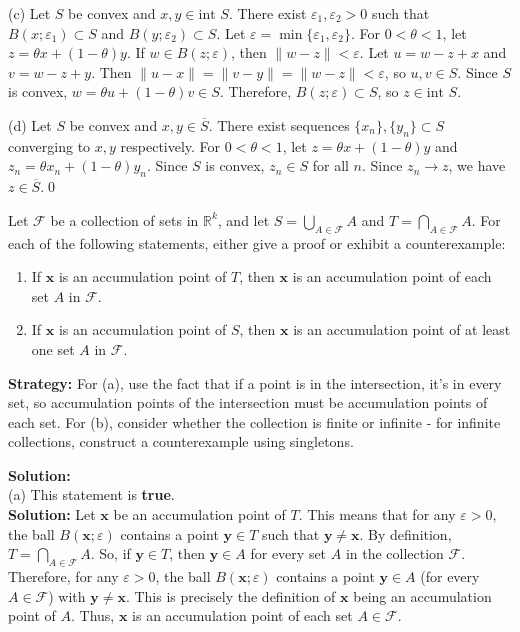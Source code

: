 (c) Let $S$ be convex and $x, y \in \text{int } S$. There exist $\varepsilon_1, \varepsilon_2 > 0$ such that $B(x;\varepsilon_1) \subset S$ and $B(y;\varepsilon_2) \subset S$. Let $\varepsilon = \min\{\varepsilon_1, \varepsilon_2\}$. For $0 < \theta < 1$, let $z = \theta x + (1-\theta)y$. If $w \in B(z;\varepsilon)$, then $\|w-z\| < \varepsilon$. Let $u = w - z + x$ and $v = w - z + y$. Then $\|u-x\| = \|v-y\| = \|w-z\| < \varepsilon$, so $u, v \in S$. Since $S$ is convex, $w = \theta u + (1-\theta)v \in S$. Therefore, $B(z;\varepsilon) \subset S$, so $z \in \text{int } S$.

(d) Let $S$ be convex and $x, y \in \overline{S}$. There exist sequences $\{x_n\}, \{y_n\} \subset S$ converging to $x, y$ respectively. For $0 < \theta < 1$, let $z = \theta x + (1-\theta)y$ and $z_n = \theta x_n + (1-\theta)y_n$. Since $S$ is convex, $z_n \in S$ for all $n$. Since $z_n \to z$, we have $z \in \overline{S}$.\qed


\begin{problembox}            
Let $\mathcal{F}$ be a collection of sets in $\mathbb{R}^k$, and let $S = \bigcup_{A \in \mathcal{F}} A$ and $T = \bigcap_{A \in \mathcal{F}} A$. For each of the following statements, either give a proof or exhibit a counterexample:
\begin{enumerate}[label=\alph*)]
\item If $\mathbf{x}$ is an accumulation point of $T$, then $\mathbf{x}$ is an accumulation point of each set $A$ in $\mathcal{F}$.
\item If $\mathbf{x}$ is an accumulation point of $S$, then $\mathbf{x}$ is an accumulation point of at least one set $A$ in $\mathcal{F}$.
\end{enumerate}
\end{problembox}

\noindent\textbf{Strategy:} For (a), use the fact that if a point is in the intersection, it's in every set, so accumulation points of the intersection must be accumulation points of each set. For (b), consider whether the collection is finite or infinite - for infinite collections, construct a counterexample using singletons.

\bigskip\noindent\textbf{Solution:}\\
(a) This statement is \textbf{true}.\\
\bigskip\noindent\textbf{Solution:} Let $\mathbf{x}$ be an accumulation point of $T$. This means that for any $\varepsilon > 0$, the ball $B(\mathbf{x}; \varepsilon)$ contains a point $\mathbf{y} \in T$ such that $\mathbf{y} \neq \mathbf{x}$. By definition, $T = \bigcap_{A \in \mathcal{F}} A$. So, if $\mathbf{y} \in T$, then $\mathbf{y} \in A$ for every set $A$ in the collection $\mathcal{F}$. Therefore, for any $\varepsilon > 0$, the ball $B(\mathbf{x}; \varepsilon)$ contains a point $\mathbf{y} \in A$ (for every $A \in \mathcal{F}$) with $\mathbf{y} \neq \mathbf{x}$. This is precisely the definition of $\mathbf{x}$ being an accumulation point of $A$. Thus, $\mathbf{x}$ is an accumulation point of each set $A \in \mathcal{F}$.

